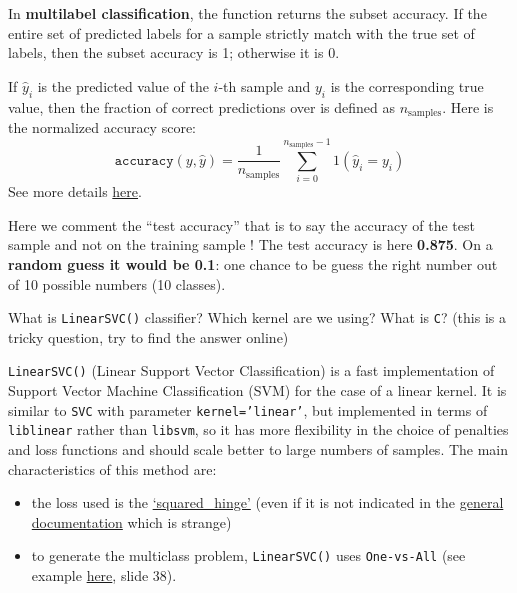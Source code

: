 \documentclass[10pt,a4paper]{article}
\providecommand{\tightlist}{%
  \setlength{\parskip}{0pt}
  }
\theoremstyle{break}
\begin{document}
In \textbf{multilabel classification}, the function returns the subset accuracy. If the entire set of predicted labels for a sample strictly match with the true set of labels, then the subset accuracy is 1; otherwise it is 0.

If \(\hat{y}_i\) is the predicted value of the \(i\)-th sample and \(y_i\) is the corresponding true value, then the fraction of correct predictions over is defined as \(n_\text{samples}\). Here is the normalized accuracy score:
\[
\texttt{accuracy}(y, \hat{y}) = \frac{1}{n_\text{samples}} \sum_{i=0}^{n_\text{samples}-1} 1(\hat{y}_i = y_i)
\]
See more details \href{https://scikit-learn.org/stable/modules/model_evaluation.html\#accuracy-score}{here}.

Here we comment the ``test accuracy'' that is to say the accuracy of the test sample and not on the training sample ! The test accuracy is here \textbf{0.875}. On a \textbf{random guess it would be 0.1}: one chance to be guess the right number out of 10 possible numbers (10 classes).

\begin{tcolorbox}

What is \texttt{LinearSVC()} classifier? Which kernel are we using? What is \texttt{C}? (this is a tricky question, try to find the answer online)

\end{tcolorbox}

\texttt{LinearSVC()} (Linear Support Vector Classification) is a fast implementation of Support Vector Machine Classification (SVM) for the case of a linear kernel. It is similar to \texttt{SVC} with parameter \texttt{kernel=’linear’}, but implemented in terms of \texttt{liblinear} rather than \texttt{libsvm}, so it has more flexibility in the choice of penalties and loss functions and should scale better to large numbers of samples.
The main characteristics of this method are:

\begin{itemize}
\tightlist
\item
  the loss used is the \href{https://en.wikipedia.org/wiki/Hinge_loss}{`squared\_hinge'} (even if it is not indicated in the \href{https://scikit-learn.org/stable/modules/svm.html\#linearsvc}{general documentation} which is strange)
\item
  to generate the multiclass problem, \texttt{LinearSVC()} uses \texttt{One-vs-All} (see example \href{http://eric.univ-lyon2.fr/~ricco/cours/slides/svm.pdf}{here}, slide 38).
\end{itemize}
\end{document}
